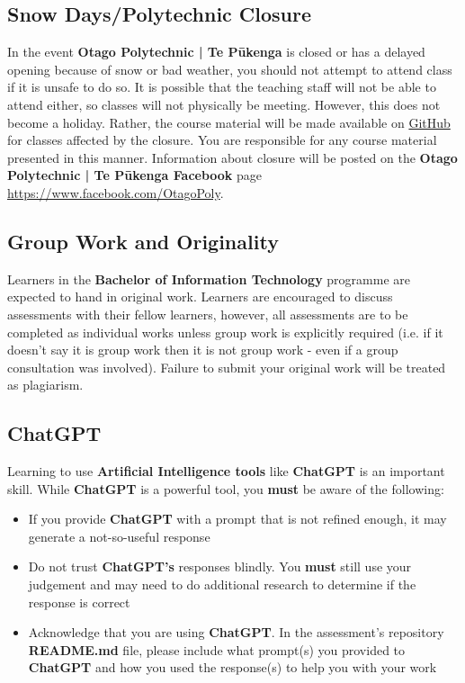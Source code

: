 \documentclass{article}
\begin{document}
\subsection*{Snow Days/Polytechnic Closure}
In the event \textbf{Otago Polytechnic | Te Pūkenga} is closed or has a delayed opening because of snow or bad weather, you should not attempt to attend class if it is unsafe to do so. It is possible that the teaching staff will not be able to attend either, so classes will not physically be meeting. However, this does not become a holiday. Rather, the course material will be made available on \href{https://github.com/otago-polytechnic-bit-courses/ID511001-programming-2}{GitHub} for classes affected by the closure. You are responsible for any course material presented in this manner. Information about closure will be posted on the \textbf{Otago Polytechnic | Te Pūkenga Facebook} page \href{https://www.facebook.com/OtagoPoly}{https://www.facebook.com/OtagoPoly}.

\subsection*{Group Work and Originality}
Learners in the \textbf{Bachelor of Information Technology} programme are expected to hand in original work. Learners are encouraged to discuss assessments with their fellow learners, however, all assessments are to be completed as individual works unless group work is explicitly required (i.e. if it doesn't say it is group work then it is not group work - even if a group consultation was involved). Failure to submit your original work will be treated as plagiarism.

\subsection*{ChatGPT}
Learning to use \textbf{Artificial Intelligence tools} like \textbf{ChatGPT} is an important skill. While \textbf{ChatGPT} is a powerful tool, you \textbf{must} be aware of the following:

\begin{itemize}
    \item If you provide \textbf{ChatGPT} with a prompt that is not refined enough, it may generate a not-so-useful response
    \item Do not trust \textbf{ChatGPT's} responses blindly. You \textbf{must} still use your judgement and may need to do additional research to determine if the response is correct
    \item Acknowledge that you are using \textbf{ChatGPT}. In the assessment's repository \textbf{README.md} file, please include what prompt(s) you provided to \textbf{ChatGPT} and how you used the response(s) to help you with your work
\end{itemize}
\end{document}
